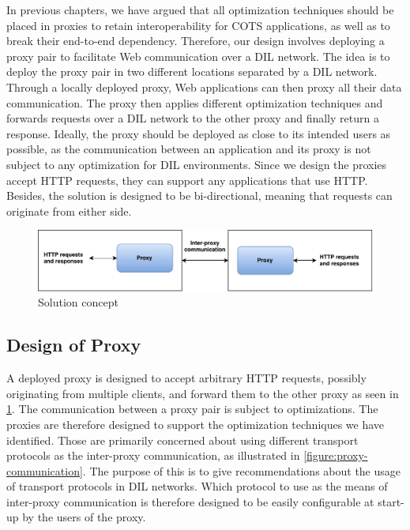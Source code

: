 In previous chapters, we have argued that all optimization techniques should be
placed in proxies to retain interoperability for COTS applications, as well as
to break their end-to-end dependency. Therefore, our design involves deploying a
proxy pair to facilitate Web communication over a DIL network. The idea is to
deploy the proxy pair in two different locations separated by a DIL network.
Through a locally deployed proxy, Web applications can then proxy all their data
communication. The proxy then applies different optimization techniques and
forwards requests over a DIL network to the other proxy and finally return a
response. Ideally, the proxy should be deployed as close to its intended users
as possible, as the communication between an application and its proxy is not
subject to any optimization for DIL environments. Since we design the proxies
accept HTTP requests, they can support any applications that use HTTP. Besides,
the solution is designed to be bi-directional, meaning that requests can
originate from either side.

\begin{figure}[h]
\includegraphics[width=\textwidth]{images/proxy_design.pdf}
\caption{Solution concept}
\label{figure:proxy_design}
\end{figure}


\subsection{Design of Proxy}

A deployed proxy is designed to accept arbitrary HTTP requests, possibly
originating from multiple clients, and forward them to the other proxy as seen
in \cref{figure:proxy_design}. The communication between a proxy pair is subject
to optimizations. The proxies are therefore designed to support the optimization
techniques we have identified. Those are primarily concerned about using
different transport protocols as the inter-proxy communication, as illustrated
in \cref{figure:proxy-communication}. The purpose of this is to give
recommendations about the usage of transport protocols in DIL networks. Which
protocol to use as the means of inter-proxy communication is therefore designed
to be easily configurable at start-up by the users of the proxy.


